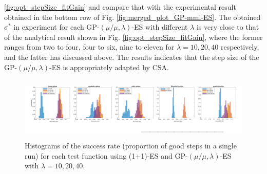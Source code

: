\ref{fig:opt_stepSize_fitGain} and compare that with the experimental result obtained in the bottom row of Fig. \ref{fig:merged_plot_GP-mml-ES}. The obtained $\sigma^*$ in experiment for each GP-$(\mu/\mu,\lambda)$-ES with different $\lambda$ is very close to that of the analytical result shown in Fig. \ref{fig:opt_stepSize_fitGain}, where the former ranges from two to four, four to six, nine to eleven for $\lambda=10,20,40$ respectively, and the latter has discussed above. The results indicates that the step size of the GP-$(\mu/\mu,\lambda)$-ES is appropriately adapted by CSA. 




\begin{center}
\begin{figure}
\includegraphics[height=1.2in, width=6in]{success_NO_emergency_v3_final.pdf}
\caption{Histograms of the success rate (proportion of good steps in a single run) for each test function using (1+1)-ES and GP-$(\mu/\mu,\lambda)$-ES with $\lambda=10,20,40$. 
}
\label{fig:success_plot_GP-mml-ES}


\end{figure}
\end{center}



